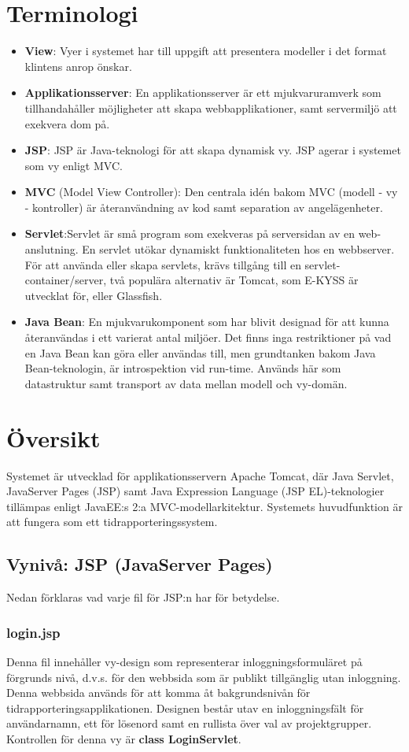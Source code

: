 \documentclass[paper=a4, fontsize=11pt,twoside]{article}
\begin{document}
\section{Terminologi}
\begin{itemize}
\item \textbf{View}: Vyer i systemet har till uppgift att presentera modeller i
det format klintens anrop önskar.
\item \textbf{Applikationsserver}: En applikationsserver är ett mjukvaruramverk
som tillhandahåller möjligheter att skapa webbapplikationer, samt servermiljö att exekvera dom på.
\item \textbf{JSP}: JSP är Java-teknologi för att skapa dynamisk vy. JSP agerar
i systemet som vy enligt MVC. 
\item \textbf{MVC} (Model View Controller): Den centrala idén bakom MVC (modell
- vy - kontroller) är återanvändning av kod samt separation av angelägenheter.
\item \textbf{Servlet}:Servlet är små program som exekveras på serversidan av en
web-anslutning. En servlet utökar dynamiskt funktionaliteten hos en webbserver. För att använda eller skapa servlets, krävs tillgång till en servlet-container/server, två populära alternativ är Tomcat, som E-KYSS är utvecklat för, eller Glassfish.
\item \textbf{Java Bean}: En mjukvarukomponent som har blivit designad för att
kunna återanvändas i ett varierat antal miljöer. Det finns inga restriktioner på vad en Java Bean kan göra eller användas till, men grundtanken bakom Java Bean-teknologin, är introspektion vid run-time. Används här som datastruktur samt transport av data mellan modell och vy-domän.
\end{itemize}

\newpage
\section{Översikt}
Systemet är utvecklad för applikationsservern Apache Tomcat, där Java Servlet, JavaServer Pages (JSP) samt Java Expression Language (JSP EL)-teknologier tillämpas enligt JavaEE:s 2:a MVC-modellarkitektur. Systemets huvudfunktion är att fungera som ett tidrapporteringssystem.


\subsection{Vynivå: JSP (JavaServer Pages)}
Nedan förklaras vad varje fil för JSP:n har för betydelse.
\subsubsection{login.jsp}
Denna fil innehåller vy-design som representerar inloggningsformuläret på förgrunds nivå, d.v.s. för den webbsida som är 		publikt tillgänglig utan inloggning. Denna webbsida används för att komma åt bakgrundsnivån för tidrapporteringsapplikationen. Designen består utav en inloggningsfält för användarnamn, ett för lösenord samt en rullista över val av projektgrupper. Kontrollen för denna vy är \textbf{class LoginServlet}.
\end{document}
